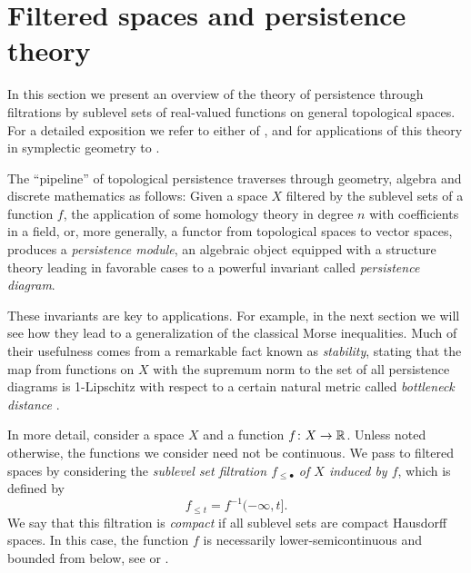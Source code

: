 
\section{Filtered spaces and persistence theory} \label{s:persistence}

In this section we present an overview of the theory of persistence through filtrations by sublevel sets of real-valued functions on general topological spaces.
For a detailed exposition we refer to either of \cite{Chazal.2016a, Oudot.2015, Polterovich.2020}, and for applications of this theory in symplectic geometry to 
\cite{Polterovich.2016, Usher.2016, LeRoux.2018, Shelukhin.2019}.

The ``pipeline'' of topological persistence traverses through geometry, algebra and discrete mathematics as follows:
Given a space $X$ filtered by the sublevel sets of a function $f$, the application of some homology theory in degree $n$ with coefficients in a field, or, more generally, a functor from topological spaces to vector spaces, produces a \emph{persistence module}, an algebraic object equipped with a structure theory leading in favorable cases to a powerful invariant called \emph{persistence diagram}.

These invariants are key to applications.
For example, in the next section we will see how they lead to a generalization of the classical Morse inequalities.
Much of their usefulness comes from a remarkable fact known as \emph{stability}, stating that the map from functions on $X$ with the supremum norm to the set of all persistence diagrams is 1-Lipschitz with respect to a certain natural metric called \emph{bottleneck distance} \cite{Cohen-Steiner.2007}.

In more detail, consider a space $X$ and a function $f \colon X \to \mathbb{R}$.
Unless noted otherwise, the functions we consider need not be continuous.
We pass to filtered spaces by considering the \emph{sublevel set filtration $f_{\leq \bullet}$ of $X$ induced by $f$}, which is defined by
\begin{equation*}
f_{\leq t} = f^{-1}(-\infty, t].
\end{equation*}
We say that this filtration is \emph{compact} if all sublevel sets are compact Hausdorff spaces.
In this case, the function $f$ is necessarily lower-semicontinuous and bounded from below, see \cite[p.~444]{Morse.1939} or \cite[Theorem 3.1]{Struwe.1988}.


